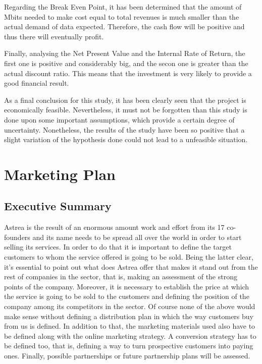 Regarding the Break Even Point, it has been determined that the amount of Mbits needed to make cost equal to total revenues is much smaller than the actual demand of data expected. Therefore, the cash flow will be positive and thus there will eventually profit.

Finally, analysing the Net Present Value and the Internal Rate of Return, the first one is positive and considerably big, and the secon one is greater than the actual discount ratio. This means that the investment is very likely to provide a good financial result.

As a final conclusion for this study, it has been clearly seen that the project is economically feasible. Nevertheless, it must not be forgotten than this study is done upon some important assumptions, which provide a certain degree of uncertainty. Nonetheless, the results of the study have been so positive that a slight variation of the hypothesis done could not lead to a unfeasible situation. 



\chapter{Marketing Plan}
\section{Executive Summary}
Astrea is the result of an enormous amount work and effort from its 17 co-founders and its name needs to be spread all over the world in order to start selling its services. In order to do that it is important to define the target customers to whom the service offered is going to be sold. Being the latter clear, it's essential to point out what does Astrea offer that makes it stand out from the rest of companies in the sector, that is, making an assessment of the strong points of the company. Moreover, it is necessary to establish the price at which the service is going to be sold to the customers and defining the position of the company among its competitors in the sector.
\newline\newline
Of course none of the above would make sense without defining a distribution plan in which the way customers buy from us is defined. In addition to that, the marketing materials used also have to be defined along with the online marketing strategy.
\newline\newline
A conversion strategy has to be defined too, that is, defining a way to turn prospective customers into paying ones. Finally, possible partnerships or future partnership plans will be assessed.

